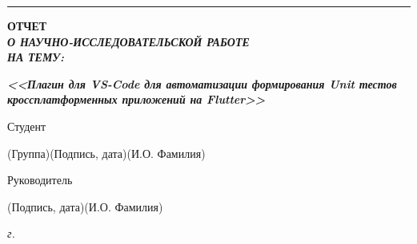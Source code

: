 \documentclass[14pt, russian]{scrartcl}
\begin{document}
\begin{titlepage}
\vspace*{-16pt}
\hspace{25pt}\rule{0.875\textwidth}{0.4pt}
 
 
\vspace{3em}
 
\begin{center}
\Large \bf{ОТЧЕТ\\\textbf{\textit{О НАУЧНО-ИССЛЕДОВАТЕЛЬСКОЙ РАБОТЕ\\НА ТЕМУ:}} \\}
\end{center}

\vspace*{-6ex} 
\begin{center}
\Large{\textit{\textbf{<<Плагин для VS-Code для автоматизации формирования Unit тестов кроссплатформенных приложений на Flutter>>}}}
\end{center}
 
\vspace{\fill}
 

\newlength{\ML}

\noindent Студент \underline{\hspace{1.5cm}} \hfill \underline{\hspace{4cm}}\quad
\underline{\hspace{4cm}}

\vspace{-2.1ex}
\noindent\hspace{9ex}\scriptsize{(Группа)}\normalsize\hspace{170pt}\hspace{2ex}\scriptsize{(Подпись, дата)}\normalsize\hspace{30pt}\hspace{6ex}\scriptsize{(И.О. Фамилия)}\normalsize

\bigskip

\noindent Руководитель  \hfill \underline{\hspace{4cm}}\quad
\underline{\hspace{4cm}}

\vspace{-2ex}
\noindent\hspace{13.5ex}\normalsize\hspace{170pt}\hspace{2ex}\scriptsize{(Подпись, дата)}\normalsize\hspace{30pt}\hspace{6ex}\scriptsize{(И.О. Фамилия)}\normalsize
\vfill

 


\begin{center}
\textsl{\the\year{} г.}
\end{center}
\end{titlepage}
\end{document}
